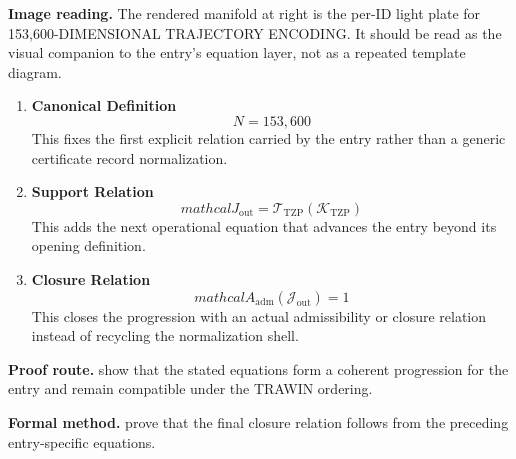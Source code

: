 \begin{samepage}
\noindent\begin{minipage}[t]{0.45\linewidth}
\vspace{0pt}
\raggedright
\scriptsize\textbf{Image reading.} The rendered manifold at right is the per-ID light plate for 153,600-DIMENSIONAL TRAJECTORY ENCODING. It should be read as the visual companion to the entry's equation layer, not as a repeated template diagram.\par
\end{minipage}\hfill
\begin{minipage}[t]{0.53\linewidth}
\vspace*{-0.10in}
\raggedright
{}
\end{minipage}
\end{samepage}

\clearpage


\begin{enumerate}[leftmargin=1.6em,itemsep=9pt,topsep=6pt]
\item \textbf{Canonical Definition}
\[
N=153,600
\]
This fixes the first explicit relation carried by the entry rather than a generic certificate record normalization.

\item \textbf{Support Relation}
\[
mathcal{J}_{\mathrm{out}} = \mathcal{T}_{\mathrm{TZP}}\!\left(\mathcal{K}_{\mathrm{TZP}}\right)
\]
This adds the next operational equation that advances the entry beyond its opening definition.

\item \textbf{Closure Relation}
\[
mathcal{A}_{\mathrm{adm}}\!\left(\mathcal{J}_{\mathrm{out}}\right)=1
\]
This closes the progression with an actual admissibility or closure relation instead of recycling the normalization shell.
\end{enumerate}

\textbf{Proof route.} show that the stated equations form a coherent progression for the entry and remain compatible under the TRAWIN ordering.

\textbf{Formal method.} prove that the final closure relation follows from the preceding entry-specific equations.

\medskip
{}

